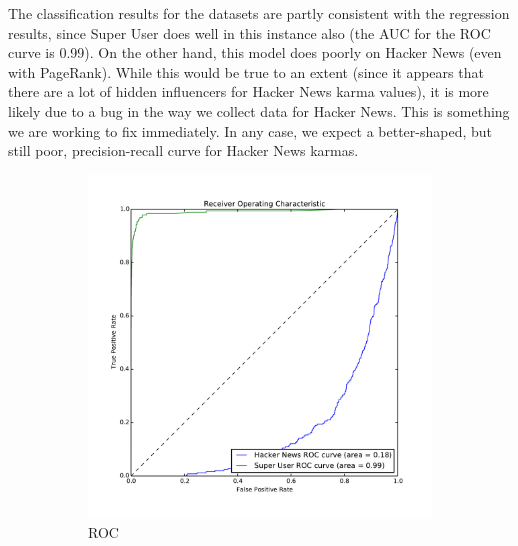 \documentclass[10pt]{article}
\begin{document}
The classification results for the datasets are partly consistent with the
regression results, since Super User does well in this instance also (the AUC
for the ROC curve is 0.99). On the other hand, this model does poorly on Hacker
News (even with PageRank). While this would be true to an extent (since it
appears that there are a lot of hidden influencers for Hacker News karma
values), it is more likely due to a bug in the way we collect data for Hacker
News. This is something we are working to fix immediately. In any case, we
expect a better-shaped, but still poor, precision-recall curve for Hacker News
karmas.

\begin{figure}[h]
\centering
\begin{subfigure}{0.5\textwidth}
\centering
\includegraphics[width=\linewidth]{classification_roc}
\caption{ROC}
\label{fig:roc}
\end{subfigure}%
\begin{subfigure}{0.5\textwidth}
\centering

\end{subfigure}
\end{figure}
\end{document}

